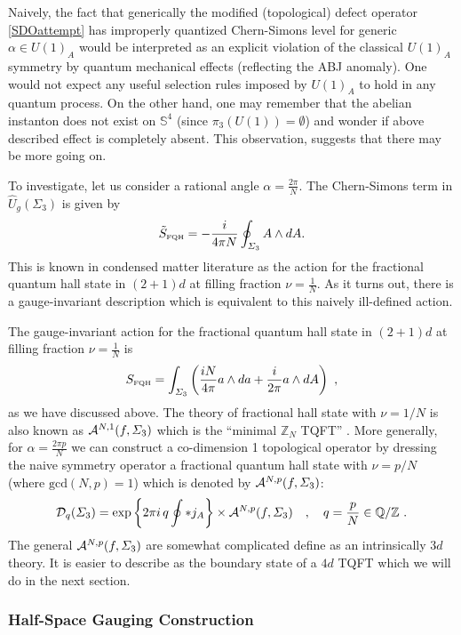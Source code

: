 \documentclass[11pt]{article}
\newcommand{\eq}[1]{\begin{align}\begin{split}#1\end{split}\end{align}}
\def\CA{{\cal A}}
\def\CD {{\cal D}}
\def\IQ{\mathbb{Q}}
\def\IS{{\mathbb{S}}}
\def\IZ{{\mathbb{Z}}}
\def\beq{\begin{equation}}
\def\eeq{\end{equation}}
\begin{document}
Naively, the fact that generically the modified (topological) defect operator \eqref{SDOattempt} has improperly quantized Chern-Simons level for generic $\alpha \in U(1)_A$ would be interpreted as an explicit violation of the classical $U(1)_A$ symmetry by quantum mechanical effects (reflecting the  ABJ anomaly). One would not expect any useful selection rules imposed by $U(1)_A$ to hold in any quantum process. On the other hand, one may remember that the abelian instanton does not exist on $\IS^4$ (since $\pi_3 (U(1)) = \emptyset$) and wonder if above described effect is completely absent. This observation, suggests that there may be more going on.  

To investigate, let us consider a rational angle $\alpha = \frac{2\pi}{N}$. The Chern-Simons term in $\widehat{U}_g (\Sigma_3)$ is given by
%
\beq
\tilde{S}_{\rm \scriptscriptstyle FQH} = - \frac{i}{4\pi N} \oint_{\Sigma_3} A \wedge dA.
\label{eq:FQH_1}
\eeq
%
This is known in condensed matter literature as the action for the fractional quantum hall state in $(2+1)d$ at filling fraction $\nu = \frac{1}{N}$.  
As it turns out, there is a gauge-invariant description which is equivalent to this naively ill-defined action. 

The gauge-invariant action for the fractional quantum hall state in $(2+1)d$ at filling fraction $\nu = \frac{1}{N}$ is 
%
\beq
S_{\rm \scriptscriptstyle FQH} = \int_{\Sigma_3} \left(\frac{iN}{4\pi} a \wedge da + \frac{i}{2\pi}  a \wedge dA\right)~,
\label{eq:FQH_2}
\eeq
as we have discussed above. 
The theory of fractional hall state with $\nu = 1/N$   is also known as $\CA^{N,1}(f,\Sigma_3)$ which is the ``minimal $\IZ_N$ TQFT'' \cite{Hsin:2020nts}. More generally, for $\alpha=\frac{2\pi p}{N}$ we can construct a co-dimension 1 topological operator by dressing the naive symmetry operator a fractional quantum hall state with $\nu=p/N$  (where $\text{gcd} (N,p) = 1$) which is denoted by $\CA^{N,p}(f,\Sigma_3)$:
\eq{\label{eq:NIS_Dq}
\CD_q(\Sigma_3)={\rm exp}\left\{2\pi i\, q \oint \ast j_A\right\}\times \CA^{N,p}(f,\Sigma_3)\quad, \quad q=\frac{p}{N}\in \IQ/\IZ~.
}
The general $\CA^{N,p}(f,\Sigma_3)$ are somewhat complicated define as an intrinsically $3d$ theory. It is easier to describe as the boundary state of a $4d$ TQFT which we will do in the next section. 
 


\subsubsection{Half-Space Gauging Construction}
\label{subsubsec:NIS_half_space}
\end{document}
